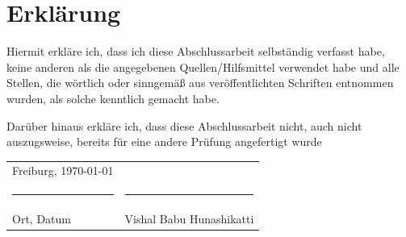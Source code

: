 \begingroup
\setlength{\parindent}{0pt}

\section*{Erklärung}

\bigskip
\bigskip
\bigskip

Hiermit erkläre ich, dass ich diese Abschlussarbeit selbständig verfasst habe, keine anderen
als die angegebenen Quellen/Hilfsmittel verwendet habe und alle Stellen, die wörtlich oder
sinngemäß aus veröffentlichten Schriften entnommen wurden, als solche kenntlich gemacht
habe.

Darüber hinaus erkläre ich, dass diese Abschlussarbeit nicht, auch nicht
auszugsweise, bereits für eine andere Prüfung angefertigt wurde

\bigskip
\bigskip
\bigskip
\bigskip
\bigskip
\bigskip

\begin{tabular}{p{} l}
    Freiburg, \today             &                              \\
    \rule{\textwidth*2/5}{0.4pt} & \rule{\textwidth*2/5}{0.4pt} \\
    Ort, Datum                   & Vishal Babu Hunashikatti
\end{tabular}

\endgroup
